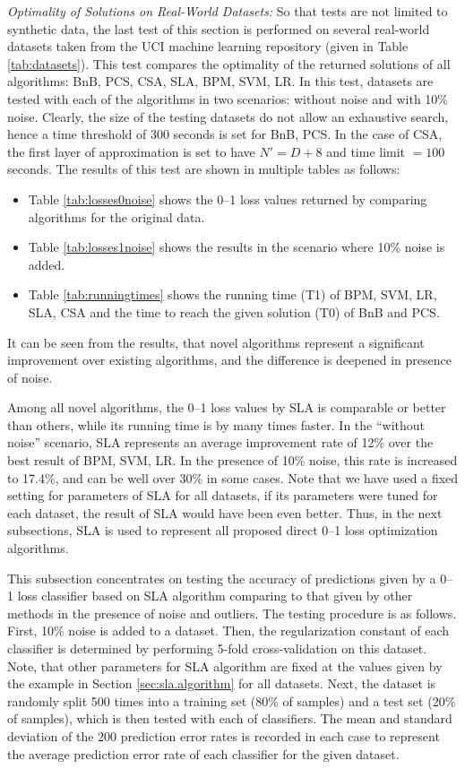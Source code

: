 \noindent\emph{Optimality of Solutions on Real-World Datasets:}
So that tests are not limited to synthetic data, the last test of this
section is performed on several real-world datasets taken from the UCI
machine learning repository (given in Table \ref{tab:datasets}). This
test compares the optimality of the returned solutions of all
algorithms: BnB, PCS, CSA, SLA, BPM, SVM, LR. In this test, datasets
are tested with each of the algorithms in two scenarios: without noise
and with 10\% noise. Clearly, the size of the testing datasets do not
allow an exhaustive search, hence a time threshold of 300 seconds is
set for BnB, PCS. In the case of CSA, the first layer of approximation
is set to have $N'=D+8$ and time limit $=100$ seconds. The results of
this test are shown in multiple tables as follows:
\begin{itemize}
\setlength{\itemsep}{4pt} 
\setlength{\parskip}{1pt}
\setlength{\parsep}{1pt}
\item Table \ref{tab:losses0noise} shows the 0--1 loss values returned by comparing algorithms for the original data.
\item Table \ref{tab:losses1noise} shows the results in the scenario where 10\% noise is added.
\item Table \ref{tab:runningtimes} shows the running time (T1) of BPM, SVM, LR, SLA, CSA and the time to reach the given solution (T0) of BnB and PCS.
\end{itemize}

It can be seen from the results, that novel algorithms represent a
significant improvement over existing algorithms, and the difference
is deepened in presence of noise.

Among all novel algorithms, the 0--1 loss values by SLA is comparable
or better than others, while its running time is by many times
faster. In the ``without noise'' scenario, SLA represents an average
improvement rate of 12\% over the best result of BPM, SVM, LR. In the
presence of 10\% noise, this rate is increased to 17.4\%, and can be
well over 30\% in some cases. Note that we have used a fixed setting
for parameters of SLA for all datasets, if its parameters were tuned
for each dataset, the result of SLA would have been even better. Thus,
in the next subsections, SLA is used to represent all proposed direct
0--1 loss optimization algorithms.

This subsection concentrates
on testing the accuracy of predictions given by a 0--1 loss classifier
based on SLA algorithm comparing to that given by other methods in the
presence of noise and outliers. The testing procedure is as
follows. First, 10\% noise is added to a dataset. Then, the
regularization constant of each classifier is determined by performing
5-fold cross-validation on this dataset. Note, that other parameters
for SLA algorithm are fixed at the values given by the example in
Section \ref{sec:sla.algorithm} for all datasets. Next, the dataset is
randomly split 500 times into a training set (80\% of samples) and a
test set (20\% of samples), which is then tested with each of
classifiers. The mean and standard deviation of the 200 prediction
error rates is recorded in each case to represent the average
prediction error rate of each classifier for the given dataset.

